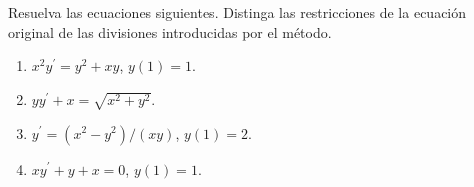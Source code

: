 Resuelva las ecuaciones siguientes. Distinga las restricciones de la ecuación original de las divisiones introducidas por el método.

\begin{enumerate}[label=(\alph*),ref=\alph*,leftmargin=*]
\item $x^2y^{\prime}=y^2+xy$, $y(1)=1$.
\item $yy^{\prime}+x=\sqrt{x^2+y^2}$.
\item $y^{\prime}=(x^2-y^2)/(xy)$, $y(1)=2$.
\item $xy^{\prime}+y+x=0$, $y(1)=1$.
\end{enumerate}
